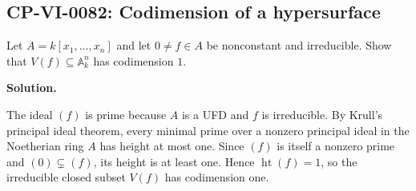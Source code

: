 
\subsection*{CP-VI-0082: Codimension of a hypersurface}

Let $A=k[x_1,\dots,x_n]$ and let $0\ne f\in A$ be nonconstant and irreducible. Show that $V(f)\subseteq\mathbb A_k^n$ has codimension $1$.

\medskip
\noindent\textbf{Solution.}

The ideal $(f)$ is prime because $A$ is a UFD and $f$ is irreducible. By Krull's principal ideal theorem, every minimal prime over a nonzero principal ideal in the Noetherian ring $A$ has height at most one. Since $(f)$ is itself a nonzero prime and $(0)\subsetneq(f)$, its height is at least one. Hence $\operatorname{ht}(f)=1$, so the irreducible closed subset $V(f)$ has codimension one.
